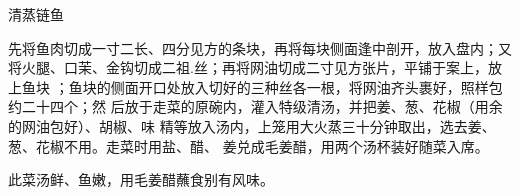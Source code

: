 \begin{recipe}{清蒸链鱼}

\ingredients


\cooking

\step 先将鱼肉切成一寸二长、四分见方的条块，再将每块侧面逢中剖开，放入盘内；又
将火腿、口茉、金钩切成二祖.丝；再将网油切成二寸见方张片，平铺于案上，放上鱼块
；鱼块的侧面开口处放入切好的三种丝各一根，将网油齐头裹好，照样包约二十四个；然
后放于走菜的原碗内，灌入特级清汤，并把姜、葱、花椒（用余的网油包好）、胡椒、味
精等放入汤内，上笼用大火蒸三十分钟取出，选去姜、葱、花椒不用。走菜时用盐、醋、
姜兑成毛姜醋，用两个汤杯装好随菜入席。

\features

此菜汤鲜、鱼嫩，用毛姜醋蘸食别有风味。

\end{recipe}

